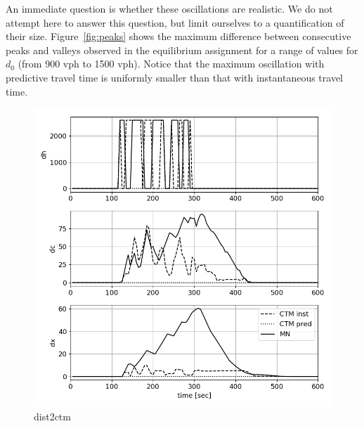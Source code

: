 An immediate question is whether these oscillations are realistic. We do not attempt here to answer this question, but limit ourselves to a quantification of their size. Figure~\ref{fig:peaks} shows the maximum difference between consecutive peaks and valleys observed in the equilibrium assignment for a range of values for $d_0$ (from 900 vph to 1500 vph). Notice that the maximum oscillation with predictive travel time is uniformly smaller than that with instantaneous travel time. 

\begin{figure}[h]
    \centering
    \includegraphics[width=\linewidth]{figs/dist2ctm.png}
    \caption{dist2ctm}
    \label{fig:dist2ctm}
\end{figure}

